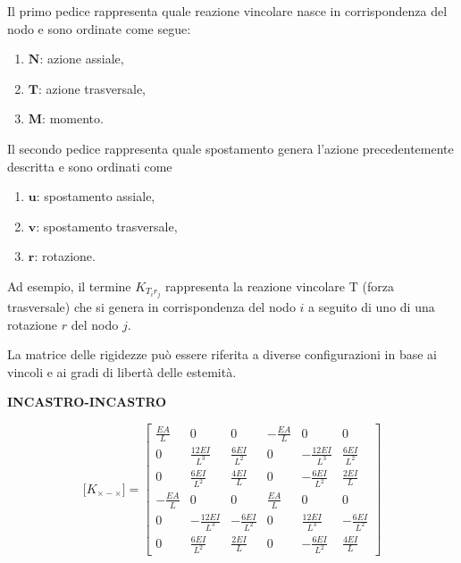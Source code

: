 \documentclass[10pt,a4paper]{article}
\begin{document}
Il primo pedice rappresenta quale reazione vincolare nasce in corrispondenza  del nodo e sono ordinate come segue:
\begin{enumerate}
    \item $\mathbf{N}$: azione assiale, 
    \item $\mathbf{T}$: azione trasversale, 
    \item $\mathbf{M}$: momento.
\end{enumerate}

Il secondo pedice rappresenta quale spostamento genera l'azione precedentemente descritta e sono ordinati come 

\begin{enumerate}
    \item $\mathbf{u}$: spostamento assiale,
    \item $\mathbf{v}$: spostamento trasversale,
    \item $\mathbf{r}$: rotazione.
\end{enumerate}

Ad esempio,  il termine $K_{T_ir_j}$ rappresenta la reazione vincolare T (forza trasversale) che si genera in corrispondenza del nodo $i$  a seguito di uno di una rotazione $r$ del nodo $j$.

La matrice delle rigidezze può essere riferita a diverse configurazioni in base ai vincoli e ai gradi di libertà delle estemità.

\vspace{1em}

\textbf{INCASTRO-INCASTRO}

\begin{equation} 
    \mathbf[K_{\times-\times}] =
        \begin{bmatrix}
        \frac{EA}{L} & 0 & 0 & -\frac{EA}{L} & 0 & 0 \\[10pt]
        0 & \frac{12EI}{L^3} & \frac{6EI}{L^2} & 0 & -\frac{12EI}{L^3} & \frac{6EI}{L^2} \\[10pt]
        0 & \frac{6EI}{L^2} & \frac{4EI}{L} & 0 & -\frac{6EI}{L^2} & \frac{2EI}{L} \\[10pt]
        -\frac{EA}{L} & 0 & 0 & \frac{EA}{L} & 0 & 0 \\[10pt]
        0 & -\frac{12EI}{L^3} & -\frac{6EI}{L^2} & 0 & \frac{12EI}{L^3} & -\frac{6EI}{L^2} \\[10pt]
        0 & \frac{6EI}{L^2} & \frac{2EI}{L} & 0 & -\frac{6EI}{L^2} & \frac{4EI}{L}
        \end{bmatrix}
\end{equation}
\end{document}
